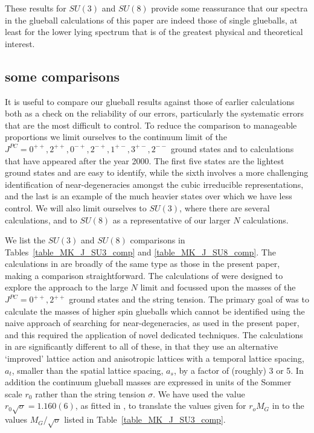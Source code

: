 \documentclass[12pt]{article}
\begin{document}
These results for $SU(3)$ and $SU(8)$ provide some reassurance that our spectra
in the glueball calculations of this paper are indeed those of single glueballs,
at least for the lower lying spectrum that is of the greatest physical and
theoretical interest.


%
%
\subsection{some comparisons}
\label{subsection_comparisons}

It is useful to compare our glueball results against those of earlier calculations both as
a check on the reliability of our errors, particularly the systematic errors that are the most
difficult to control. To reduce the comparison to manageable proportions we limit
ourselves to the continuum limit of the $J^{PC}=0^{++},2^{++},0^{-+},2^{-+},1^{+-},3^{+-},2^{--}$
ground states and to calculations that have appeared after the year 2000. The first five states
are the lightest ground states and are easy to identify, while the sixth involves a more
challenging identification of near-degeneracies amongst the cubic irreducible representations,
and the last is an example of the much heavier states over which we have less control.
We will also limit ourselves to $SU(3)$, where there are several calculations, and to $SU(8)$
as a representative of our larger $N$ calculations.

We list the $SU(3)$ and $SU(8)$ comparisons in Tables~\ref{table_MK_J_SU3_comp} and
\ref{table_MK_J_SU8_comp}. The calculations in
%
\cite{BLMT_N,BLMTUW_N,HM_Thesis}
%
are broadly of the same type as those in the present paper, making a comparison straightforward.
The calculations of
%
\cite{BLMT_N,BLMTUW_N}
%
were designed to explore the approach to the large $N$ limit and focussed upon the masses of
the $J^{PC}=0^{++},2^{++}$ ground states and the string tension. The primary goal of
%
\cite{HM_Thesis}
%
was to calculate the masses of higher spin glueballs which cannot be identified using the
naive approach of searching for near-degeneracies, as used in the present paper, and this required
the application of novel dedicated techniques. The calculations in 
%
\cite{MP-2005}
%
are significantly different to all of these, in that they use an alternative `improved' lattice
action and anisotropic lattices with a temporal lattice
spacing, $a_t$, smaller  than the spatial lattice spacing, $a_s$, by a factor of (roughly) 3 or 5.
In addition the continuum glueball masses are expressed in units of the Sommer scale $r_0$
rather than the string tension $\sigma$. We have used the value $r_0\surd\sigma = 1.160(6)$,
as fitted in
%
\cite{AAMT-2020},
%
to translate the values given for $r_oM_G$ in 
%
\cite{MP-2005}
%
to the values $M_G/\surd\sigma$ listed in Table~\ref{table_MK_J_SU3_comp}.
\end{document}
